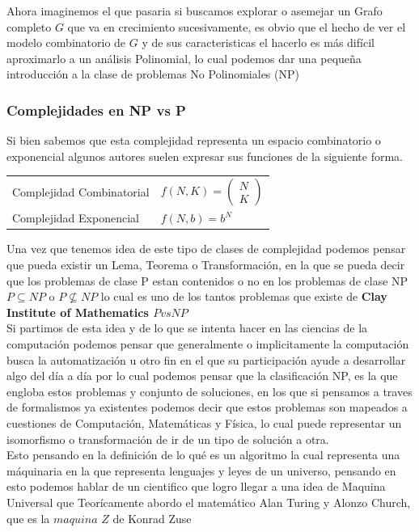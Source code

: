 \documentclass[10pt,executivepaper]{article}
\begin{document}
Ahora imaginemos el que pasaria si buscamos explorar o asemejar un Grafo completo $G$ que va en crecimiento sucesivamente, es obvio que el hecho de ver el modelo combinatorio de $G$ y de sus caracteristicas el hacerlo es más difícil aproximarlo a un análisis Polinomial, lo cual podemos dar una pequeña introducción a la clase de problemas No Polinomiales (NP)
\subsubsection{Complejidades en NP vs P}
Si bien sabemos que esta complejidad representa un espacio combinatorio o exponencial algunos autores suelen expresar sus funciones de la siguiente forma.
\begin{center}
  \begin{tabular}{ p{5cm} p{4cm} }
    Complejidad Combinatorial & $f(N,K)=\begin{pmatrix}N\\K\end{pmatrix}$\\
    Complejidad Exponencial & $f(N,b)=b^N$\\
  \end{tabular}
\end{center}
Una vez que tenemos idea de este tipo de clases de complejidad podemos pensar que pueda existir un Lema, Teorema o Transformación, en la que se pueda decir que los problemas de clase P estan contenidos o no en los problemas de clase NP $P \subseteq NP $ o $P \nsubseteq NP$ lo cual es uno de los tantos problemas que existe de \textbf{Clay Institute of Mathematics $P vs NP$}\\
Si partimos de esta idea y de lo que se intenta hacer en las ciencias de la computación podemos pensar que generalmente o implicitamente la computación busca la automatización u otro fin en el que su participación ayude a desarrollar algo del día a día por lo cual podemos pensar que la clasificación NP, es la que engloba estos problemas y conjunto de soluciones, en los que si pensamos a traves de formalismos ya existentes podemos decir que estos problemas son mapeados a cuestiones de Computación, Matemáticas y Física, lo cual puede representar un isomorfismo o transformación de ir de un tipo de solución a otra.\\
Esto pensando en la definición de lo qué es un algoritmo la cual representa una máquinaria en la que representa lenguajes y leyes de un universo, pensando en esto podemos hablar de un cientifico que logro llegar a una idea de Maquina Universal que Teorícamente abordo el matemático Alan Turing y Alonzo Church, que es la $maquina$ $Z$ de Konrad Zuse

\printindex
\end{document}
